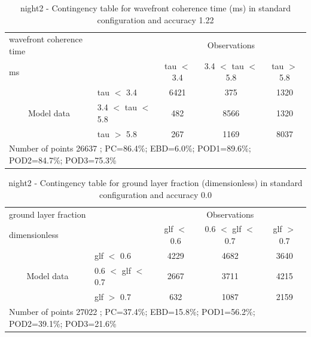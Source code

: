 \begin{table}[p!]
\begin{center}
\begin{tabular}{llccc}
\hline
{wavefront coherence time}                                       &                                                    & \multicolumn{3}{c}{Observations}                 \\
{ms}                                       &                             & tau $<$ 3.4   & 3.4 $<$ tau $<$ 5.8 & tau $>$ 5.8 \\
\hline
\multicolumn{1}{c}{\multirow{3}{*}{Model data}}  & tau $<$ 3.4             & 6421                & 375                       & 1320              \\
                                                 & 3.4  $<$ tau $<$ 5.8 & 482                & 8566                       & 1320              \\
                                                 & tau $>$ 5.8             & 267                & 1169                       & 8037              \\
\hline
\multicolumn{5}{l}{ Number of points        26637 ; PC=86.4\%; EBD=6.0\%; POD1=89.6\%; POD2=84.7\%; POD3=75.3\%}
\end{tabular}
\end{center}
\caption{night2 - Contingency table for  wavefront coherence time (ms) in standard configuration and accuracy 1.22}
\label{tab:contingencytauBEF:night2}
\end{table}
\clearpage
\begin{table}[p!]
\begin{center}
\begin{tabular}{llccc}
\hline
{ground layer fraction}                                       &                                                    & \multicolumn{3}{c}{Observations}                 \\
{dimensionless}                                       &                             & glf $<$ 0.6   & 0.6 $<$ glf $<$ 0.7 & glf $>$ 0.7 \\
\hline
\multicolumn{1}{c}{\multirow{3}{*}{Model data}}  & glf $<$ 0.6             & 4229                & 4682                       & 3640              \\
                                                 & 0.6  $<$ glf $<$ 0.7 & 2667                & 3711                       & 4215              \\
                                                 & glf $>$ 0.7             & 632                & 1087                       & 2159              \\
\hline
\multicolumn{5}{l}{ Number of points        27022 ; PC=37.4\%; EBD=15.8\%; POD1=56.2\%; POD2=39.1\%; POD3=21.6\%}
\end{tabular}
\end{center}
\caption{night2 - Contingency table for  ground layer fraction (dimensionless) in standard configuration and accuracy 0.0}
\label{tab:contingencyglfBEF:night2}
\end{table}
